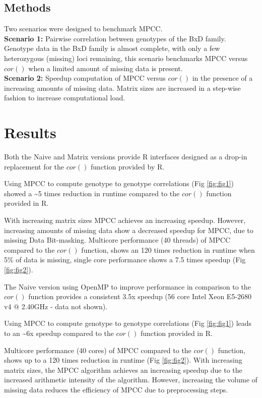 \documentclass{bioinfo}
\begin{document}
\begin{methods}

\section{Methods}
Two scenarios were designed to benchmark MPCC.\\ {\bf Scenario 1:}
Pairwise correlation between genotypes of the BxD family.  Genotype
data in the BxD family is almost complete, with only a few
heterozygous (missing) loci remaining, this scenario benchmarks MPCC
versus $cor()$ when a limited amount of missing data is present.\\
{\bf Scenario 2:} Speedup computation of MPCC versus $cor()$ in the
presence of a increasing amounts of missing data. Matrix sizes are
increased in a step-wise fashion to increase computational load.
\end{methods}

\vspace*{-2mm}

\section{Results}

Both the Naive and Matrix versions provide R interfaces designed as a
drop-in replacement for the $cor()$ function provided by R.

Using MPCC to compute genotype to genotype correlations
(Fig \ref{fig:fig1}) showed a \textasciitilde{}5 times reduction in
runtime compared to the $cor()$ function provided in R.

With increasing matrix sizes MPCC achieves an increasing
speedup. However, increasing amounts of missing data show a decreased
speedup for MPCC, due to missing Data Bit-masking. Multicore
performance (40 threads) of MPCC compared to the $cor()$ function,
shows an 120 times reduction in runtime when 5\% of data is missing,
single core performance shows a 7.5 times speedup
(Fig \ref{fig:fig2}).

The Naive version using OpenMP to improve performance in comparison to
the $cor()$ function provides a consistent 3.5x speedup (56 core Intel
Xeon E5-2680 v4 $@$ 2.40GHz - data not shown).

Using MPCC to compute genotype to genotype correlations
(Fig \ref{fig:fig1}) leads to an \textasciitilde{}6x speedup compared
to the $cor()$ function provided in R.

Multicore performance (40 cores) of MPCC compared to the $cor()$
function, shows up to a 120 times reduction in runtime
(Fig \ref{fig:fig2}). With increasing matrix sizes, the MPCC algorithm
achieves an increasing speedup due to the increased arithmetic
intensity of the algorithm. However, increasing the volume of missing
data reduces the efficiency of MPCC due to preprocessing steps.
\end{document}
